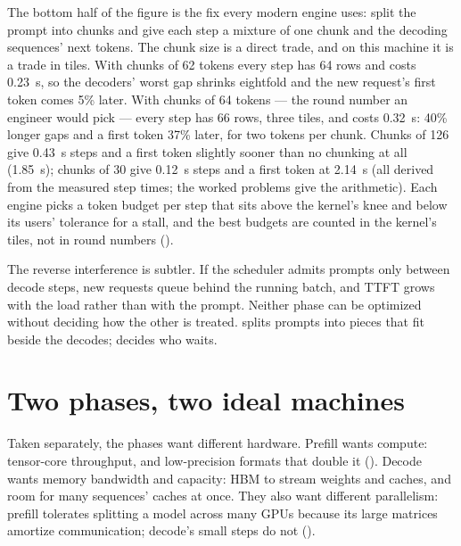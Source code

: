 
The bottom half of the figure is the fix every modern engine uses: split the
prompt into chunks and give each step a mixture of one chunk and the decoding
sequences' next tokens. The chunk size is a direct trade, and on this machine
it is a trade in tiles. With chunks of 62 tokens every step has 64 rows and
costs 0.23~s, so the decoders' worst gap shrinks eightfold and the new
request's first token comes 5\% later. With chunks of 64 tokens --- the round
number an engineer would pick --- every step has 66 rows, three tiles, and costs
0.32~s: 40\% longer gaps and a first token 37\% later, for two tokens per
chunk. Chunks of 126 give 0.43~s steps and a first token slightly sooner than
no chunking at all (1.85~s); chunks of 30 give 0.12~s steps and a first token
at 2.14~s (all derived from the measured step times; the worked problems give
the arithmetic). Each engine picks a token budget per step that sits above the
kernel's knee and below its users' tolerance for a stall, and the best budgets
are counted in the kernel's tiles, not in round numbers ().

The reverse interference is subtler. If the scheduler admits prompts only
between decode steps, new requests queue behind the running batch, and TTFT
grows with the load rather than with the prompt. Neither phase can be
optimized without deciding how the other is treated. 
splits prompts into pieces that fit beside the decodes;
 decides who waits.

\section{Two phases, two ideal machines}

Taken separately, the phases want different hardware. Prefill wants compute:
tensor-core throughput, and low-precision formats that double it
(). Decode wants memory bandwidth and capacity: HBM
to stream weights and caches, and room for many sequences' caches at once.
They also want different parallelism: prefill tolerates splitting a model
across many GPUs because its large matrices amortize communication; decode's
small steps do not ().

